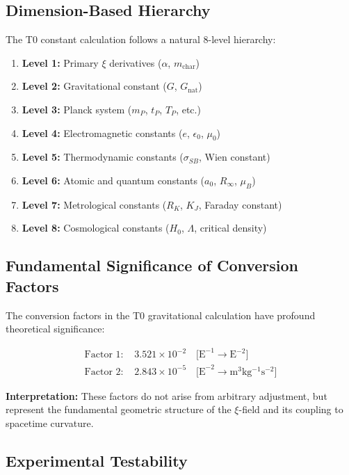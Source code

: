 \documentclass[12pt,a4paper]{report}
\begin{document}
	\subsection{Dimension-Based Hierarchy}
	
	The T0 constant calculation follows a natural 8-level hierarchy:
	
	\begin{enumerate}
		\item \textbf{Level 1:} Primary $\xi$ derivatives ($\alpha$, $m_{\text{char}}$)
		\item \textbf{Level 2:} Gravitational constant ($G$, $G_{\text{nat}}$)
		\item \textbf{Level 3:} Planck system ($m_P$, $t_P$, $T_P$, etc.)
		\item \textbf{Level 4:} Electromagnetic constants ($e$, $\epsilon_0$, $\mu_0$)
		\item \textbf{Level 5:} Thermodynamic constants ($\sigma_{SB}$, Wien constant)
		\item \textbf{Level 6:} Atomic and quantum constants ($a_0$, $R_\infty$, $\mu_B$)
		\item \textbf{Level 7:} Metrological constants ($R_K$, $K_J$, Faraday constant)
		\item \textbf{Level 8:} Cosmological constants ($H_0$, $\Lambda$, critical density)
	\end{enumerate}
	
	\subsection{Fundamental Significance of Conversion Factors}
	
	The conversion factors in the T0 gravitational calculation have profound theoretical significance:
	
	\begin{align}
		\text{Factor 1: } &3.521 \times 10^{-2} \quad \text{[E}^{-1} \rightarrow \text{E}^{-2}\text{]} \\
		\text{Factor 2: } &2.843 \times 10^{-5} \quad \text{[E}^{-2} \rightarrow \si{\meter^3 \kilogram^{-1} \second^{-2}}\text{]}
	\end{align}
	
	\textbf{Interpretation:} These factors do not arise from arbitrary adjustment, but represent the fundamental geometric structure of the $\xi$-field and its coupling to spacetime curvature.
	
	\subsection{Experimental Testability}
	
\end{document}
